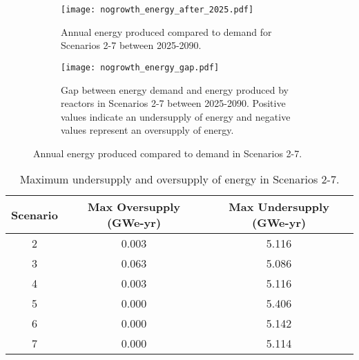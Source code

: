 \begin{figure}
    \centering
    \begin{subfigure}[b]{0.45\textwidth}
        \centering
        \texttt{[image: nogrowth\_energy\_after\_2025.pdf]}
        \caption{Annual energy produced compared to demand for Scenarios 2-7
        between 2025-2090.}
        \label{fig:nogrowth_energy_after_2025}
    \end{subfigure}
    \hfill
    \begin{subfigure}[b]{0.45\textwidth}
        \centering
        \texttt{[image: nogrowth\_energy\_gap.pdf]}
        \caption{Gap between energy demand and energy produced by reactors 
        in Scenarios 2-7 between 2025-2090. Positive values indicate an 
        undersupply of energy and negative values represent an 
        oversupply of energy.}
        \label{fig:nogrowth_energy_gap}
    \end{subfigure}
       \caption{Annual energy produced compared to demand in Scenarios 2-7.}
       \label{fig:nogrowth_energy}
\end{figure}

\begin{table}
    \centering
    \caption{Maximum undersupply and oversupply of energy in Scenarios 2-7.}
    \label{tab:nogrowth_energy}
    \begin{tabular}{c c c}
        \hline 
        Scenario & Max Oversupply (GWe-yr) & Max Undersupply (GWe-yr) \\
        \hline 
        2 & 0.003 & 5.116 \\
        3 & 0.063 & 5.086 \\
        4 & 0.003 & 5.116 \\
        5 & 0.000 & 5.406 \\
        6 & 0.000 & 5.142 \\
        7 & 0.000 & 5.114 \\
        \hline
        
    \end{tabular}
\end{table}

